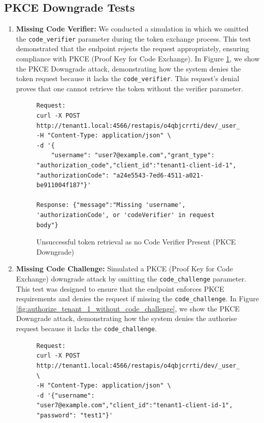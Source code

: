 \subsection{PKCE Downgrade Tests}
\begin{enumerate}

    \item \textbf{Missing Code Verifier:} We conducted a simulation in which we omitted the \texttt{code\_verifier}  parameter during the token exchange process. This test demonstrated that the endpoint rejects the request appropriately, ensuring compliance with PKCE (Proof Key for Code Exchange). In Figure \ref{fig:token_no_code_veri}, we show the PKCE Downgrade attack, demonstrating how the system denies the token request because it lacks the \texttt{code\_verifier}. This request's denial proves that one cannot retrieve the token without the verifier parameter.

        \begin{figure}[!htbp]
    \centering
    \begin{lstlisting}[style=curlstyle]
Request:
curl -X POST http://tenant1.local:4566/restapis/o4qbjcrrti/dev/_user_request_/token\                                      
-H "Content-Type: application/json" \
-d '{
    "username": "user7@example.com","grant_type": "authorization_code","client_id":"tenant1-client-id-1", "authorizationCode": "a24e5543-7ed6-4511-a021-be911004f187"}'

Response: {"message":"Missing 'username', 'authorizationCode', or 'codeVerifier' in request body"}
    \end{lstlisting}
    \caption{Unsuccessful token retrieval as no Code Verifier Present (PKCE Downgrade)}
    \label{fig:token_no_code_veri}
\end{figure}

    \item \textbf{Missing Code Challenge:} Simulated a PKCE (Proof Key for Code Exchange) downgrade attack by omitting the \texttt{code\_challenge} parameter. This test was designed to ensure that the endpoint enforces PKCE requirements and denies the request if missing the \texttt{code\_challenge}. In Figure \ref{fig:authorize_tenant_1_without_code_challenge}, we show the PKCE Downgrade attack, demonstrating how the system denies the authorise request because it lacks the \texttt{code\_challenge}. 


        \begin{figure}[!htbp]
    \centering
    \begin{lstlisting}[style=curlstyle]
Request:
curl -X POST http://tenant1.local:4566/restapis/o4qbjcrrti/dev/_user_request_/authorize \                                  
-H "Content-Type: application/json" \
-d '{"username": "user7@example.com","client_id":"tenant1-client-id-1", "password": "test1"}'


\end{lstlisting}
\end{figure}
\end{enumerate}

